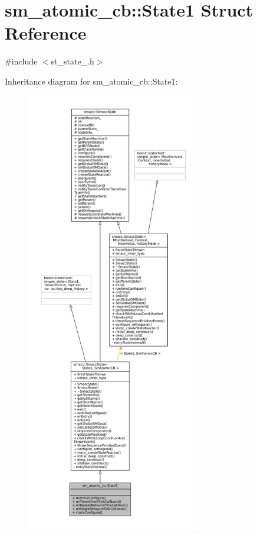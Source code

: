 \hypertarget{structsm__atomic__cb_1_1State1}{}\section{sm\+\_\+atomic\+\_\+cb\+:\+:State1 Struct Reference}
\label{structsm__atomic__cb_1_1State1}


{\ttfamily \#include $<$st\+\_\+state\+\_.\+h$>$}



Inheritance diagram for sm\+\_\+atomic\+\_\+cb\+:\+:State1\+:
\nopagebreak
\begin{figure}[H]
\begin{center}
\leavevmode
\includegraphics[height=550pt]{structsm__atomic__cb_1_1State1__inherit__graph}
\end{center}
\end{figure}



